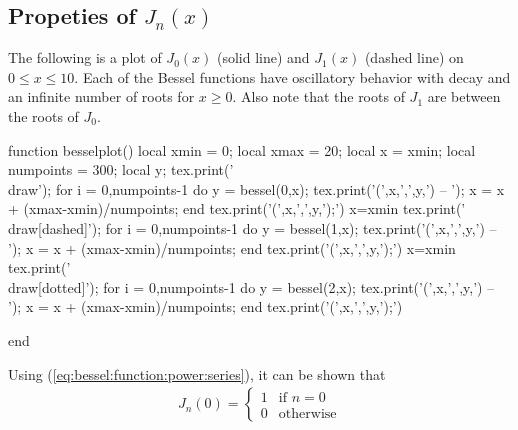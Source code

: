 \subsection{Propeties of $J_n(x)$}

The following is a plot of $J_0(x)$ (solid line) and $J_1(x)$ (dashed line) on $0 \leq x \leq 10$.  Each of the Bessel functions have oscillatory behavior with decay and an infinite number of roots for $x \geq 0$.    Also note that the roots of $J_1$ are between the roots of $J_0$.

\begin{luacode}
function besselplot()
  local xmin = 0;
  local xmax = 20;
  local x = xmin;
  local numpoints = 300;
  local y;
  tex.print('\\draw');
  for i = 0,numpoints-1 do
    y = bessel(0,x);
    tex.print('(',x,',',y,') -- ');
    x = x + (xmax-xmin)/numpoints;
  end
  tex.print('(',x,',',y,');')
  x=xmin
  tex.print('\\draw[dashed]');
  for i = 0,numpoints-1 do
    y = bessel(1,x);
    tex.print('(',x,',',y,') -- ');
    x = x + (xmax-xmin)/numpoints;
  end
  tex.print('(',x,',',y,');')
  x=xmin
  tex.print('\\draw[dotted]');
  for i = 0,numpoints-1 do
    y = bessel(2,x);
    tex.print('(',x,',',y,') -- ');
    x = x + (xmax-xmin)/numpoints;
  end
  tex.print('(',x,',',y,');')

end
\end{luacode}
\newcommand{\bplot}{\directlua{besselplot()}}

\begin{center}
\end{center}

Using (\ref{eq:bessel:function:power:series}), it can be shown that
%
\begin{align*}
J_n(0) = \begin{cases}
1 & \text{if $n=0$} \\
0 & \text{otherwise}
\end{cases}
\end{align*}

